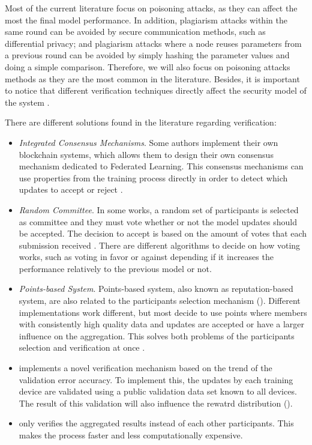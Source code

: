 Most of the current literature focus on poisoning attacks, as they can affect the most the final model performance. In addition, plagiarism attacks within the same round can be avoided by secure communication methods, such as differential privacy; and plagiarism attacks where a node reuses parameters from a previous round can be avoided by simply hashing the parameter values and doing a simple comparison. Therefore, we will also focus on poisoning attacks methods as they are the most common in the literature. Besides, it is important to notice that different verification techniques directly affect the security model of the system \cite{10.48550/arxiv.2110.02182}.

There are different solutions found in the literature regarding verification:

\begin{itemize}
    \item \textit{Integrated Consensus Mechanisms}. Some authors implement their own blockchain systems, which allows them to design their own consensus mechanism dedicated to Federated Learning. This consensus mechanisms can use properties from the training process directly in order to detect which updates to accept or reject \cite{9293091, 10.1007/978-981-15-9213-3_12}.
    
    \item \textit{Random Committee}. In some works, a random set of participants is selected as committee and they must vote whether or not the model updates should be accepted. The decision to accept is based on the amount of votes that each submission received \cite{9159643}. There are different algorithms to decide on how voting works, such as voting in favor or against depending if it increases the performance relatively to the previous model or not.
    
    \item \textit{Points-based System}. Points-based system, also known as reputation-based system, are also related to the participants selection mechanism (). Different implementations work different, but most decide to use points where members with consistently high quality data and updates are accepted or have a larger influence on the aggregation. This solves both problems of the participants selection and verification at once \cite{10.48550/arxiv.2011.07516, 9170559, Peyvandi2022, 9292450}.
    
    \item \cite{8945913} implements a novel verification mechanism based on the trend of the validation error accuracy. To implement this, the updates by each training device are validated using a public validation data set known to all devices. The result of this validation will also influence the rewatrd distribution ().
    
    \item \cite{10.48550/arxiv.2009.09338} only verifies the aggregated results instead of each other participants. This makes the process faster and less computationally expensive.
    
\end{itemize}

